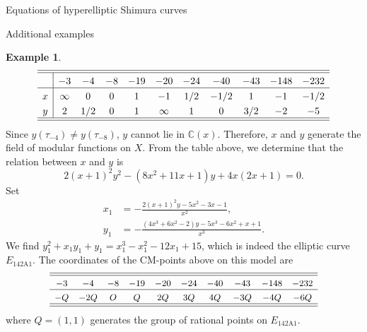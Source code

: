\documentclass{amsart}
\newcounter{lemma}
\theoremstyle{definition}
\newtheorem{Example}[lemma]{Example}
\def\C{\mathbb C}
\begin{document}
\begin{section}{Equations of hyperelliptic Shimura curves}
\begin{subsection}{Additional examples}
\begin{Example}
$$ \extrarowheight3pt
\begin{array}{c|cccccccccc} \hline\hline
  & -3 & -4 & -8 & -19 & -20 & -24 & -40 & -43 & -148 & -232 \\ \hline
x & \infty & 0 & 0 &1 & -1 & 1/2 & -1/2 & 1 & -1 & -1/2 \\
y & 2 & 1/2 & 0 & 1 & \infty & 1 & 0 & 3/2 & -2 & -5 \\ \hline\hline
\end{array}
$$
Since $y(\tau_{-4})\neq y(\tau_{-8})$, $y$ cannot lie in $\C(x)$. Therefore,
$x$ and $y$ generate the field of modular functions on $X$.
From the table above, we determine that the relation between $x$ and
$y$ is
$$
  2(x+1)^2y^2-(8x^2+11x+1)y+4x(2x+1)=0.
$$
Set
\begin{equation*}
\begin{split}
  x_1&=-\frac{2(x+1)^2y-5x^2-3x-1}{x^2}, \\
  y_1&=-\frac{(4x^3+6x^2-2)y-5x^3-6x^2+x+1}{x^3}.
\end{split}
\end{equation*}
We find $y_1^2+x_1y_1+y_1=x_1^3-x_1^2-12x_1+15$, which is indeed the
elliptic curve $E_{\text{142A1}}$. The coordinates of the CM-points
above on this model are
$$ \small\extrarowheight3pt
\begin{array}{cccccccccc} \hline\hline
  -3 & -4 & -8 & -19 & -20 & -24 & -40 & -43 & -148 & -232 \\ \hline
  -Q & -2Q & O & Q & 2Q & 3Q & 4Q & -3Q & -4Q & -6Q \\ \hline\hline
\end{array}
$$
where $Q=(1,1)$ generates the group of rational points on $E_{\text{142A1}}$. 
\end{Example}


\end{subsection}
\end{section}
\end{document}
